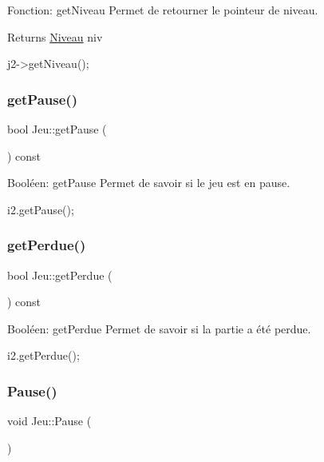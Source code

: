 Fonction\+: get\+Niveau Permet de retourner le pointeur de niveau. 

\begin{DoxyReturn}{Returns}
\hyperlink{classNiveau}{Niveau} niv 
\begin{DoxyCode}
j2->getNiveau();
\end{DoxyCode}
 
\end{DoxyReturn}
\mbox{\label{classJeu_af4cfcc4e37dc2365e657fadc8c046e95}} 
\subsubsection{\texorpdfstring{get\+Pause()}{getPause()}}
{\footnotesize\ttfamily bool Jeu\+::get\+Pause (\begin{DoxyParamCaption}{ }\end{DoxyParamCaption}) const}



Booléen\+: get\+Pause Permet de savoir si le jeu est en pause. 


\begin{DoxyCode}
i2.getPause();
\end{DoxyCode}
 \mbox{\label{classJeu_aca82760e6c37895401e1ecaa706014ea}} 
\subsubsection{\texorpdfstring{get\+Perdue()}{getPerdue()}}
{\footnotesize\ttfamily bool Jeu\+::get\+Perdue (\begin{DoxyParamCaption}{ }\end{DoxyParamCaption}) const}



Booléen\+: get\+Perdue Permet de savoir si la partie a été perdue. 


\begin{DoxyCode}
i2.getPerdue();
\end{DoxyCode}
 \mbox{\label{classJeu_a825bd1ef8b91c70e468966f6985a2ee3}} 
\subsubsection{\texorpdfstring{Pause()}{Pause()}}
{\footnotesize\ttfamily void Jeu\+::\+Pause (\begin{DoxyParamCaption}{ }\end{DoxyParamCaption})}



